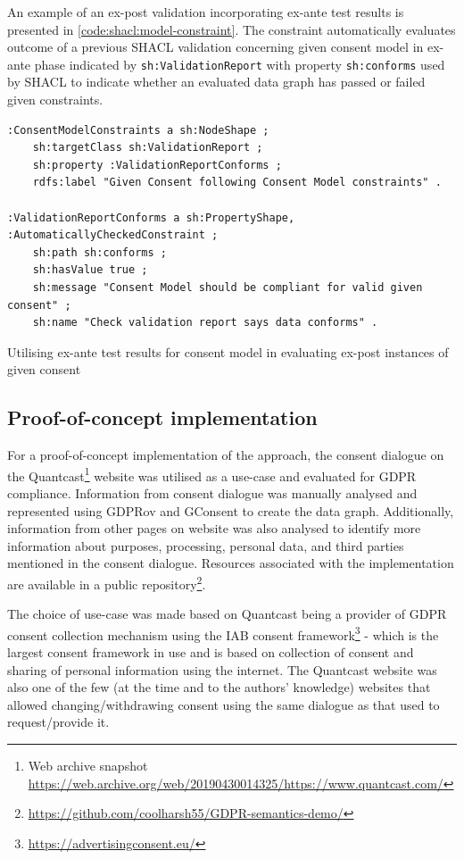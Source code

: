 An example of an ex-post validation incorporating ex-ante test results is presented in \autoref{code:shacl:model-constraint}.
The constraint automatically evaluates outcome of a previous SHACL validation concerning given consent model in ex-ante phase indicated by \texttt{sh:ValidationReport} with property \texttt{sh:conforms} used by SHACL to indicate whether an evaluated data graph has passed or failed given constraints.
\begin{listing}[htbp]
\begin{verbatim}
:ConsentModelConstraints a sh:NodeShape ;
    sh:targetClass sh:ValidationReport ; 
    sh:property :ValidationReportConforms ;
    rdfs:label "Given Consent following Consent Model constraints" .

:ValidationReportConforms a sh:PropertyShape, :AutomaticallyCheckedConstraint ;
    sh:path sh:conforms ;
    sh:hasValue true ; 
    sh:message "Consent Model should be compliant for valid given consent" ; 
    sh:name "Check validation report says data conforms" .
\end{verbatim}
\caption{Utilising ex-ante test results for consent model in evaluating ex-post instances of given consent}
\label{code:shacl:model-constraint}
\end{listing}

\subsection{Proof-of-concept implementation}\label{sec:testing:shacl:demo}
For a proof-of-concept implementation of the approach, the consent dialogue on the Quantcast\footnote{Web archive snapshot \url{https://web.archive.org/web/20190430014325/https://www.quantcast.com/}} website was utilised as a use-case and evaluated for GDPR compliance.
Information from consent dialogue was manually analysed and represented using GDPRov and GConsent to create the data graph. Additionally, information from other pages on website was also analysed to identify more information about  purposes, processing, personal data, and third parties mentioned in the consent dialogue.
Resources associated with the implementation are available in a public repository\footnote{\url{https://github.com/coolharsh55/GDPR-semantics-demo/}}.

The choice of use-case was made based on Quantcast being a provider of GDPR consent collection mechanism using the IAB consent framework\footnote{\url{https://advertisingconsent.eu/}} - which is the largest consent framework in use and is based on collection of consent and sharing of personal information using the internet. The Quantcast website was also one of the few (at the time and to the authors’ knowledge) websites that allowed changing/withdrawing consent using the same dialogue as that used to request/provide it.

